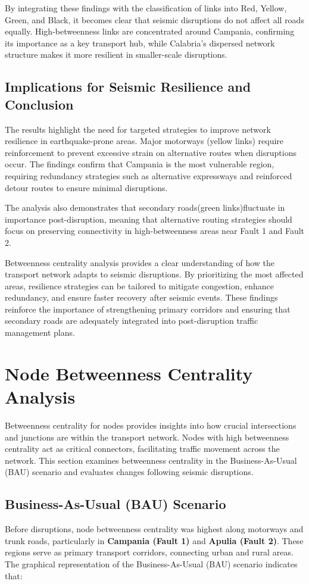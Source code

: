 By integrating these findings with the classification of links into Red, Yellow, Green, and Black, it becomes clear that seismic disruptions do not affect all roads equally. High-betweenness links are concentrated around Campania, confirming its importance as a key transport hub, while Calabria's dispersed network structure makes it more resilient in smaller-scale disruptions.

\subsection{Implications for Seismic Resilience and Conclusion}
The results highlight the need for targeted strategies to improve network resilience in earthquake-prone areas. Major motorways (yellow links) require reinforcement to prevent excessive strain on alternative routes when disruptions occur. The findings confirm that Campania is the most vulnerable region, requiring redundancy strategies such as alternative expressways and reinforced detour routes to ensure minimal disruptions.

The analysis also demonstrates that secondary roads(green links)fluctuate in importance post-disruption, meaning that alternative routing strategies should focus on preserving connectivity in high-betweenness areas near Fault 1 and Fault 2.

Betweenness centrality analysis provides a clear understanding of how the transport network adapts to seismic disruptions. By prioritizing the most affected areas, resilience strategies can be tailored to mitigate congestion, enhance redundancy, and ensure faster recovery after seismic events. These findings reinforce the importance of strengthening primary corridors and ensuring that secondary roads are adequately integrated into post-disruption traffic management plans.

\section{Node Betweenness Centrality Analysis}
Betweenness centrality for nodes provides insights into how crucial intersections and junctions are within the transport network. Nodes with high betweenness centrality act as critical connectors, facilitating traffic movement across the network. This section examines betweenness centrality in the Business-As-Usual (BAU) scenario and evaluates changes following seismic disruptions.

\subsection{Business-As-Usual (BAU) Scenario}
Before disruptions, node betweenness centrality was highest along motorways and trunk roads, particularly in \textbf{Campania (Fault 1)} and \textbf{Apulia (Fault 2)}. These regions serve as primary transport corridors, connecting urban and rural areas. The graphical representation of the Business-As-Usual (BAU) scenario indicates that:

